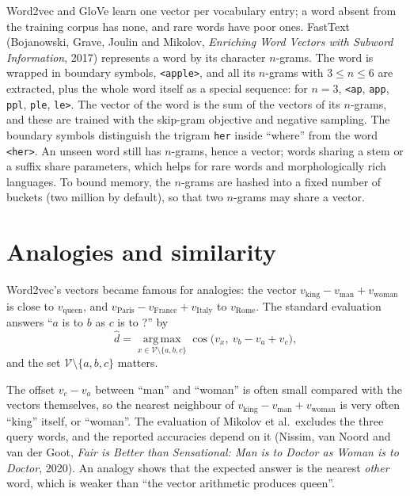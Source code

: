 \begin{notechapter}
Word2vec and GloVe learn one vector per vocabulary entry; a word absent from the training
corpus has none, and rare words have poor ones. FastText (Bojanowski, Grave, Joulin and
Mikolov, \emph{Enriching Word Vectors with Subword Information}, 2017) represents a word by
its character $n$-grams. The word is wrapped in boundary symbols, \texttt{<apple>}, and all its $n$-grams
with $3\leq n\leq6$ are extracted, plus the whole word itself as a special sequence: for $n = 3$,
\texttt{<ap}, \texttt{app}, \texttt{ppl}, \texttt{ple}, \texttt{le>}. The vector of the word is the sum of the
vectors of its $n$-grams, and these are trained with the skip-gram objective and negative
sampling. The boundary symbols distinguish the trigram \texttt{her} inside ``where'' from the
word \texttt{<her>}. An unseen word still has $n$-grams, hence a vector; words sharing a stem or a
suffix share parameters, which helps for rare words and morphologically rich languages.
To bound memory, the $n$-grams are hashed into a fixed number of buckets (two million by
default), so that two $n$-grams may share a vector.

\section{Analogies and similarity}\label{word-embeddings:sec:analogies}

Word2vec's vectors became famous for analogies: the vector $v_{\text{king}} - v_{\text{man}} + v_{\text{woman}}$ is close to $v_{\text{queen}}$,
and $v_{\text{Paris}} - v_{\text{France}} + v_{\text{Italy}}$ to $v_{\text{Rome}}$. The standard evaluation answers ``$a$ is to $b$ as $c$ is to ?'' by
\[
  \hat d = \operatorname*{arg\,max}_{x\in\mathcal V\setminus\{a,b,c\}}\cos\bigl(v_x,\ v_b - v_a + v_c\bigr),
\]
and the set $\mathcal V\setminus\{a,b,c\}$ matters.

\begin{pitfall}
The offset $v_c - v_a$ between ``man'' and ``woman'' is often small compared with the vectors
themselves, so the nearest neighbour of $v_{\text{king}} - v_{\text{man}} + v_{\text{woman}}$ is very often ``king'' itself, or
``woman''. The evaluation of Mikolov et al.\ excludes the three query words, and the
reported accuracies depend on it (Nissim, van Noord and van der Goot, \emph{Fair is Better
than Sensational: Man is to Doctor as Woman is to Doctor}, 2020). An analogy shows that the
expected answer is the nearest \emph{other} word, which is weaker than ``the vector arithmetic
produces queen''.
\end{pitfall}


\end{notechapter}
